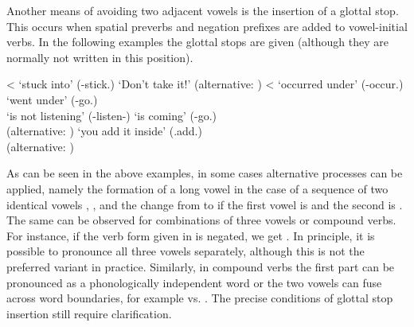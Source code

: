 Another means of avoiding two adjacent vowels is the insertion of a glottal stop. This occurs when spatial preverbs and negation prefixes are added to vowel-initial verbs. In the following examples the glottal stops are given (although they are normally not written in this position).
%
\begin{exe}
	\ex	\label{ex:glottal stop inversion phon}
	\begin{xlist}
		\TabPositions{3em}
		\ex	{}	\tab	{} <  `stuck into' (-stick.)
		\ex	\label{Don't take it!Phon}  	\tab	{} `Don't take it!'	(alternative: )	
		\ex	{}	\tab	{} <  	`occurred under' (-occur.)
		\ex	{}	\tab	{}	`went under' (-go.)\\
		\tab \tab {} `is not listening' (-listen-)
		\ex	\label{hitherGOPHON}  	\tab	{} `is coming' (-go.)\\ 
		\tab \tab (alternative: )	
		\ex	{}	\tab	{} 	
		\ex	\label{insideADDPHON} 	\tab	{} `you add it inside' (.add.)\\
		\tab \tab (alternative: )	
	\end{xlist}
\end{exe}

As can be seen in the above examples, in some cases alternative processes can be applied, namely the formation of a long vowel in the case of a sequence of two identical vowels , , and the change from  to  if the first vowel is  and the second is  . The same can be observed for combinations of three vowels or compound verbs. For instance, if the verb form  given in  is negated, we get . In principle, it is possible to pronounce all three vowels separately, although this is not the preferred variant in practice. Similarly, in compound verbs the first part can be pronounced as a phonologically independent word or the two vowels can fuse across word boundaries, for example  vs.  . The precise conditions of glottal stop insertion still require clarification.



